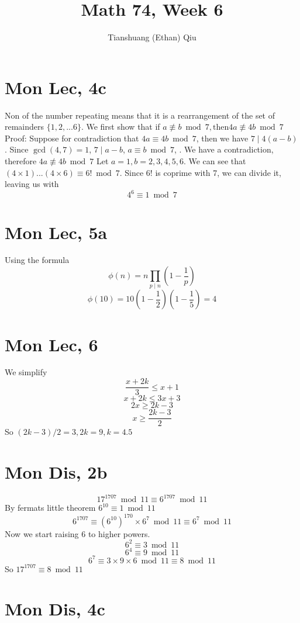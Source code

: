 \documentclass[12pt]{article}
\author{Tianshuang (Ethan) Qiu}
\begin{document}
\title{Math 74, Week 6}
\maketitle

\section{Mon Lec, 4c}
Non of the number repeating means that it is a rearrangement of the set of remainders $\{1,2,...6\}$. We first show that if $a \not \equiv b \bmod 7, \text{then} 4a \not \equiv 4b \bmod 7$
\newline
Proof:
Suppose for contradiction that $4a \equiv 4b \bmod 7$, then we have $7 \mid 4(a-b)$. Since $\gcd(4,7)=1$, $7 \mid a-b$, $a \equiv b \bmod 7$, \lightning. We have a contradiction, therefore $4a \not \equiv 4b \bmod 7$
\newline
Let $a=1, b = 2,3,4,5,6$. We can see that $(4 \times 1)...(4 \times 6) \equiv 6! \bmod 7$. Since 6! is coprime with 7, we can divide it, leaving us with
$$4^6 \equiv 1 \bmod 7$$

\section{Mon Lec, 5a}
Using the formula
$$\phi(n) = n \prod _{p \mid n}(1-\frac{1}{p})$$
$$\phi(10) = 10(1-\frac{1}{2})(1-\frac{1}{5}) = 4$$

\section{Mon Lec, 6}
We simplify
$$\frac{x+2k}{3} \leq x+1$$
$$x+2k \leq 3x+3$$
$$2x \geq 2k-3$$
$$x \geq \frac{2k-3}{2}$$
So $(2k-3)/2 = 3, 2k = 9, k = 4.5$
\newpage


\section{Mon Dis, 2b}
$$17 ^ {1707} \bmod 11 \equiv 6^{1707}\bmod 11$$
By fermats little theorem $6^10 \equiv 1 \bmod 11$
$$6^1707 \equiv (6^10)^170 \times 6^7 \bmod 11 \equiv 6^7 \bmod 11$$
Now we start raising 6 to higher powers.
$$6^2 \equiv 3 \bmod 11$$
$$6^4 \equiv 9 \bmod 11$$
$$6^7 \equiv 3\times9\times6 \bmod 11 \equiv 8 \bmod 11$$
So $17 ^ {1707} \equiv 8 \bmod 11$

\section{Mon Dis, 4c}
\end{document}
